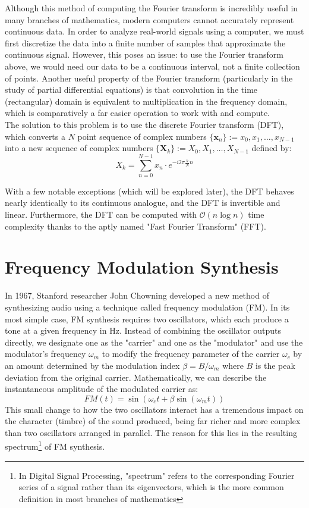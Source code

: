 \documentclass[11pt,twoside]{report}
\newcommand{\w}{\omega}
\numberwithin{thm}{section}
\numberwithin{equation}{section}
\begin{document}
Although this method of computing the Fourier transform is incredibly useful in many branches of mathematics, modern computers cannot accurately represent continuous data. In order to analyze real-world signals using a computer, we must first discretize the data into a finite number of samples that approximate the continuous signal. However, this poses an issue: to use the Fourier transform above, we would need our data to be a continuous interval, not a finite collection of points. Another useful property of the Fourier transform (particularly in the study of partial differential equations) is that convolution in the time (rectangular) domain is equivalent to multiplication in the frequency domain, which is comparatively a far easier operation to work with and compute. \\

The solution to this problem is to use the discrete Fourier transform (DFT), which converts a $N$ point sequence of complex numbers $\{\mathbf{x}_n\} := x_0, x_1, \dots, x_{N-1}$ into a new sequence of complex numbers $\{\mathbf{X}_k\} := X_0, X_1, \dots, X_{N-1}$ defined by:
$$X_k = \sum_{n=0}^{N-1}x_n \cdot e^{-i2\pi\frac{k}{N}n}$$

With a few notable exceptions (which will be explored later), the DFT behaves nearly identically to its continuous analogue, and the DFT is invertible and linear. Furthermore, the DFT can be computed with $\mathcal{O}(n\log n)$ time complexity thanks to the aptly named "Fast Fourier Transform" (FFT).

\section{Frequency Modulation Synthesis}
In 1967, Stanford researcher John Chowning developed a new method of synthesizing audio using a technique called frequency modulation (FM). In its most simple case, FM synthesis requires two oscillators, which each produce a tone at a given frequency in Hz. Instead of combining the oscillator outputs directly, we designate one as the "carrier" and one as the "modulator" and use the modulator's frequency $\w_m$ to modify the frequency parameter of the carrier $\w_c$ by an amount determined by the modulation index $\beta = B/\w_m$ where $B$ is the peak deviation from the original carrier. Mathematically, we can describe the instantaneous amplitude of the modulated carrier as:
$$FM(t) = \sin(\w_ct + \beta \sin( \w_mt))$$
This small change to how the two oscillators interact has a tremendous impact on the character (timbre) of the sound produced, being far richer and more complex than two oscillators arranged in parallel. The reason for this lies in the resulting spectrum\footnote{In Digital Signal Processing, "spectrum" refers to the corresponding Fourier series of a signal rather than its eigenvectors, which is the more common definition in most branches of mathematics} of FM synthesis. \\
\end{document}
